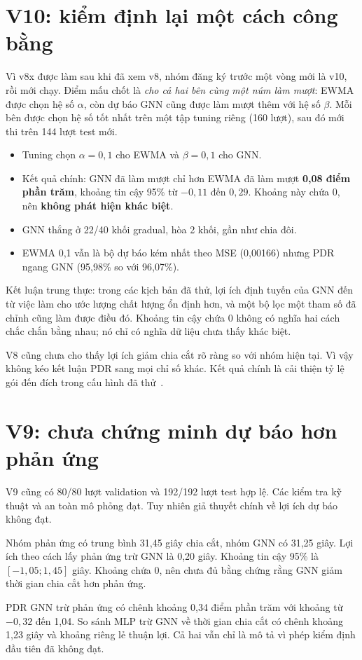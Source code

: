 \section{V10: kiểm định lại một cách công bằng}
Vì v8x được làm sau khi đã xem v8, nhóm đăng ký trước một vòng mới là v10, rồi mới chạy. Điểm mấu chốt là \emph{cho cả hai bên cùng một núm làm mượt}: EWMA được chọn hệ số $\alpha$, còn dự báo GNN cũng được làm mượt thêm với hệ số $\beta$. Mỗi bên được chọn hệ số tốt nhất trên một tập tuning riêng (160 lượt), sau đó mới thi trên 144 lượt test mới.
\begin{itemize}
\item Tuning chọn $\alpha=0{,}1$ cho EWMA và $\beta=0{,}1$ cho GNN.
\item Kết quả chính: GNN đã làm mượt chỉ hơn EWMA đã làm mượt \textbf{0,08 điểm phần trăm}, khoảng tin cậy 95\% từ $-0{,}11$ đến $0{,}29$. Khoảng này chứa 0, nên \textbf{không phát hiện khác biệt}.
\item GNN thắng ở 22/40 khối gradual, hòa 2 khối, gần như chia đôi.
\item EWMA 0,1 vẫn là bộ dự báo kém nhất theo MSE (0,00166) nhưng PDR ngang GNN (95,98\% so với 96,07\%).
\end{itemize}
Kết luận trung thực: trong các kịch bản đã thử, lợi ích định tuyến của GNN đến từ việc làm cho ước lượng chất lượng ổn định hơn, và một bộ lọc một tham số đã chỉnh cũng làm được điều đó. Khoảng tin cậy chứa 0 không có nghĩa hai cách chắc chắn bằng nhau; nó chỉ có nghĩa dữ liệu chưa thấy khác biệt.

V8 cũng chưa cho thấy lợi ích giảm chia cắt rõ ràng so với nhóm hiện tại. Vì vậy không kéo kết luận PDR sang mọi chỉ số khác. Kết quả chính là cải thiện tỷ lệ gói đến đích trong cấu hình đã thử~\cite{paper}.

\section{V9: chưa chứng minh dự báo hơn phản ứng}
V9 cũng có 80/80 lượt validation và 192/192 lượt test hợp lệ. Các kiểm tra kỹ thuật và an toàn mô phỏng đạt. Tuy nhiên giả thuyết chính về lợi ích dự báo không đạt.

Nhóm phản ứng có trung bình 31,45 giây chia cắt, nhóm GNN có 31,25 giây. Lợi ích theo cách lấy phản ứng trừ GNN là 0,20 giây. Khoảng tin cậy 95\% là $[-1,05;1,45]$ giây. Khoảng chứa 0, nên chưa đủ bằng chứng rằng GNN giảm thời gian chia cắt hơn phản ứng.

PDR GNN trừ phản ứng có chênh khoảng 0,34 điểm phần trăm với khoảng từ $-0,32$ đến 1,04. So sánh MLP trừ GNN về thời gian chia cắt có chênh khoảng 1,23 giây và khoảng riêng lẻ thuận lợi. Cả hai vẫn chỉ là mô tả vì phép kiểm định đầu tiên đã không đạt.

